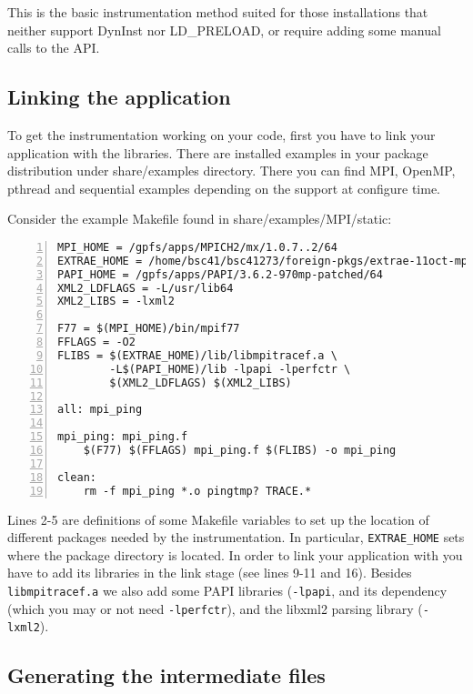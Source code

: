 This is the basic instrumentation method suited for those installations that neither support DynInst nor LD\_PRELOAD, or require adding some manual calls to the \TRACE API.

\subsection{Linking the application}\label{subsec:Examples_static_link}

To get the instrumentation working on your code, first you have to link your application with the \TRACE libraries. There are installed examples in your package distribution under share/examples directory. There you can find MPI, OpenMP, pthread and sequential examples depending on the support at configure time.

Consider the example Makefile found in share/examples/MPI/static:

\begin{Verbatim}[frame=single,numbers=left,labelposition=topline,label=Makefile]
MPI_HOME = /gpfs/apps/MPICH2/mx/1.0.7..2/64
EXTRAE_HOME = /home/bsc41/bsc41273/foreign-pkgs/extrae-11oct-mpich2/64
PAPI_HOME = /gpfs/apps/PAPI/3.6.2-970mp-patched/64
XML2_LDFLAGS = -L/usr/lib64
XML2_LIBS = -lxml2

F77 = $(MPI_HOME)/bin/mpif77 
FFLAGS = -O2
FLIBS = $(EXTRAE_HOME)/lib/libmpitracef.a \
        -L$(PAPI_HOME)/lib -lpapi -lperfctr \
        $(XML2_LDFLAGS) $(XML2_LIBS)

all: mpi_ping

mpi_ping: mpi_ping.f
	$(F77) $(FFLAGS) mpi_ping.f $(FLIBS) -o mpi_ping

clean:
	rm -f mpi_ping *.o pingtmp? TRACE.*
\end{Verbatim}

Lines 2-5 are definitions of some Makefile variables to set up the location of different packages needed by the instrumentation. In particular, {\tt EXTRAE\_HOME} sets where the \TRACE package directory is located. In order to link your application with \TRACE you have to add its libraries in the link stage (see lines 9-11 and 16). Besides {\tt libmpitracef.a} we also add some PAPI libraries ({\tt -lpapi}, and its dependency (which you may or not need {\tt -lperfctr}), and the libxml2 parsing library ({\tt -lxml2}).

\subsection{Generating the intermediate files}\label{subsec:Examples_static_Intermediate}


